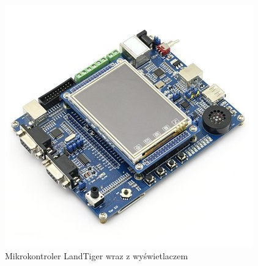 \documentclass{BscUS}
\begin{document}
\begin{figure}[h]
\centering
\includegraphics{./img/landTiger}
\caption{Mikrokontroler LandTiger wraz z wyświetlaczem \cite{landtigerDesc}}
\end{figure}
\end{document}
